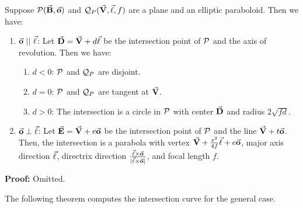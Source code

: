 \begin{lemma}
\label{lemma:para-para&perp}
     Suppose ${\cal P}(\vec{\bf B},\vec{\bf o})$ and
${\cal Q}_P(\vec{\bf V},\vec{\bf \ell},f)$ are a plane and an elliptic paraboloid.
Then we have:
\begin{enumerate}
     \item $\vec{\bf o}\ ||\ \vec{\bf \ell}$:
          Let $\vec{\bf D}=\vec{\bf V}+d\vec{\bf \ell}$ be the intersection
          point of ${\cal P}$ and the axis of revolution.
          Then we have:
     \begin{enumerate}
          \item $d<0$: ${\cal P}$ and ${\cal Q}_P$ are disjoint.
          \item $d=0$: ${\cal P}$ and ${\cal Q}_P$ are tangent at $\vec{\bf V}$.
          \item $d>0$: The intersection is a circle in ${\cal P}$ with center
               $\vec{\bf D}$ and radius $2\sqrt{fd}$.
     \end{enumerate}
     \item $\vec{\bf o}\perp\vec{\bf \ell}$:
          Let $\vec{\bf E}=\vec{\bf V}+e\vec{\bf o}$ be the intersection point of
          ${\cal P}$ and the line $\vec{\bf V}+t\vec{\bf o}$.
          Then, the intersection
          is a parabola with vertex
          $\vec{\bf V}+\frac{e^2}{4f}\vec{\bf \ell}+e\vec{\bf o}$, major axis
          direction $\vec{\bf \ell}$, directrix direction
          $\frac{\vec{\bf \ell}\times\vec{\bf o}}{|\vec{\bf \ell}\times\vec{\bf o}|}$,
          and focal length $f$.
\end{enumerate}
\end{lemma}
{\bf Proof:} Omitted. \QED

     The following theorem computes the intersection curve for the
general case.

